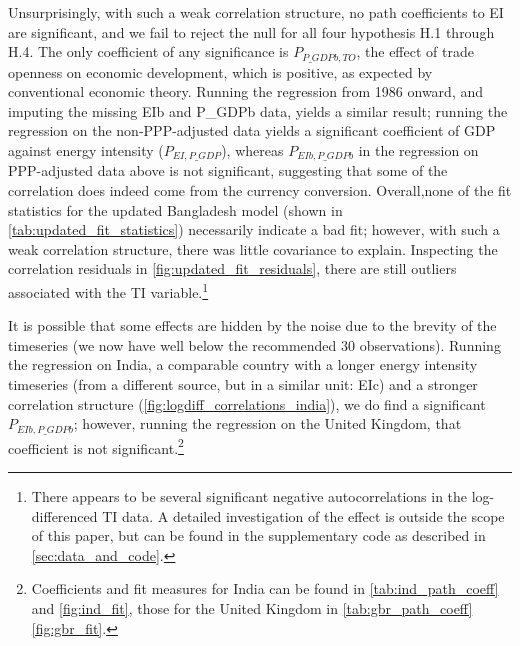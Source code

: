 \documentclass[11pt,a4paper]{article}
\begin{document}
Unsurprisingly, with such a weak correlation structure, no path coefficients to EI are significant, and we fail to reject the null for all four hypothesis H.1 through H.4.
The only coefficient of any significance is $P_{P\_GDPb,TO}$, the effect of trade openness on economic development, which is positive, as expected by conventional economic theory. 
Running the regression from 1986 onward, and imputing the missing EIb and P\_GDPb data, yields a similar result; running the regression on the non-PPP-adjusted data yields a significant coefficient of GDP against energy intensity ($P_{EI,P\_GDP}$), whereas $P_{EIb,P\_GDPb}$ in the regression on PPP-adjusted data above is not significant, suggesting that some of the correlation does indeed come from the currency conversion. 
Overall,none of the fit statistics for the updated Bangladesh model (shown in \cref{tab:updated_fit_statistics}) necessarily indicate a bad fit; however, with such a weak correlation structure, there was little covariance to explain. Inspecting the correlation residuals in \cref{fig:updated_fit_residuals}, there are still outliers associated with the TI variable.\footnote{
There appears to be several significant negative autocorrelations in the log-differenced TI data. 
A detailed investigation of the effect is outside the scope of this paper, but can be found in the supplementary code as described in \cref{sec:data_and_code}.
}

It is possible that some effects are hidden by the noise due to the brevity of the timeseries (we now have well below the recommended 30 observations). 
Running the regression on India, a comparable country with a longer energy intensity timeseries (from a different source, but in a similar unit: EIc) and a stronger correlation structure (\cref{fig:logdiff_correlations_india}), we do find a significant $P_{EIb,P\_GDPb}$; however, running the regression on the United Kingdom, that coefficient is not significant.\footnote{
Coefficients and fit measures for India can be found in \cref{tab:ind_path_coeff} and \cref{fig:ind_fit},
those for the United Kingdom in \cref{tab:gbr_path_coeff} \cref{fig:gbr_fit}.
} 
\end{document}
